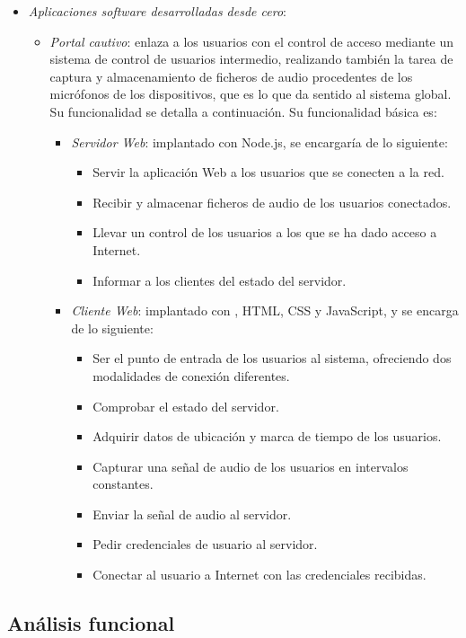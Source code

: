 \begin{itemize}
\item \emph{Aplicaciones software desarrolladas desde cero}:
\begin{itemize}
\item \emph{Portal cautivo}: enlaza a los usuarios con el control de acceso mediante un sistema de control de usuarios intermedio, realizando también la tarea de captura y almacenamiento de ficheros de audio procedentes de los micrófonos de los dispositivos, que es lo que da sentido al sistema global. Su funcionalidad se detalla a continuación. Su funcionalidad básica es:
\begin{itemize}
\item \emph{Servidor Web}: implantado con Node.js, se encargaría de lo siguiente:
\begin{itemize}
\item Servir la aplicación Web a los usuarios que se conecten a la red.
\item Recibir y almacenar ficheros de audio de los usuarios conectados.
\item Llevar un control de los usuarios a los que se ha dado acceso a Internet.
\item Informar a los clientes del estado del servidor.
\end{itemize}
\item \emph{Cliente Web}: implantado con , HTML, CSS y JavaScript, y se encarga de lo siguiente:
\begin{itemize}
\item Ser el punto de entrada de los usuarios al sistema, ofreciendo dos modalidades de conexión diferentes.
\item Comprobar el estado del servidor.
\item Adquirir datos de ubicación y marca de tiempo de los usuarios.
\item Capturar una señal de audio de los usuarios en intervalos constantes.
\item Enviar la señal de audio al servidor.
\item Pedir credenciales de usuario al servidor.
\item Conectar al usuario a Internet con las credenciales recibidas. 
\end{itemize}
\end{itemize}
\end{itemize}
\end{itemize}

\subsection{Análisis funcional}

